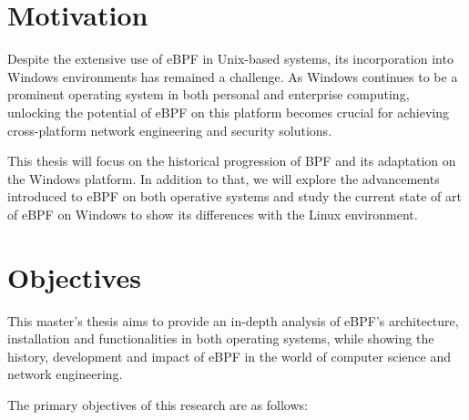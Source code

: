\section{Motivation}

Despite the extensive use of eBPF in Unix-based systems, its incorporation into Windows environments has remained a challenge. 
As Windows continues to be a prominent operating system in both personal and enterprise computing, unlocking the potential of eBPF on this platform becomes crucial for achieving cross-platform network engineering and security solutions.

This thesis will focus on the historical progression of BPF and its adaptation on the Windows platform.
In addition to that, we will explore the advancements introduced to eBPF on both operative systems and study the current state of art of eBPF on Windows to show its differences with the Linux environment. 

\section{Objectives}

This master's thesis aims to provide an in-depth analysis of eBPF's architecture, installation and functionalities in both operating systems, while showing the history, development and impact of eBPF in the world of computer science and network engineering. 

The primary objectives of this research are as follows:

